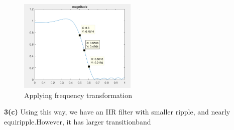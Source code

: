 \documentclass[twoside]{article}
\begin{document}
\begin{figure}[H]
   \centering
   \includegraphics[width = 0.5\textwidth]{./data/solution3b.png}  
   \caption{Applying frequency transformation}
\end{figure}
\noindent \textbf {3(c)}
Using this way, we have an IIR filter with smaller ripple, and nearly equiripple.However, it has larger transitionband\\
\end{document}
